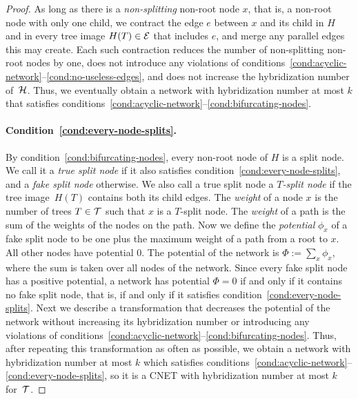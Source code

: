 \begin{proof}
  As long as there is a \emph{non-splitting} non-root node $x$, that is, a   non-root node with only one child, we contract the edge $e$ between $x$ and   its child in $H$ and in every tree image $H(T) \in \mathcal{E}$ that includes $e$, and   merge any parallel edges this may create. Each such contraction reduces the number of non-splitting non-root nodes by   one, does not introduce any violations of   conditions~\ref{cond:acyclic-network}--\ref{cond:no-useless-edges}, and does   not increase the hybridization number of~$\mathcal{H}$.   Thus, we eventually obtain a network with hybridization number at most $k$   that satisfies   conditions~\ref{cond:acyclic-network}--\ref{cond:bifurcating-nodes}.

  \paragraph{Condition~\ref{cond:every-node-splits}.}

  By condition~\ref{cond:bifurcating-nodes}, every non-root node of $H$ is a   split node.   We call it a \emph{true split node} if it also satisfies   condition~\ref{cond:every-node-splits}, and a \emph{fake split node}   otherwise.   We also call a true split node {a \emph{$T$-split node} if the tree image~$H(T)$ contains both its child edges.}   The \emph{weight} of a node $x$ is the number of trees $T \in \mathcal{T}$ such that   $x$ is a $T$-split node. The \emph{weight} of a path is the sum of the weights of the nodes on the path. Now we define the \emph{potential} $\phi_x$ of a fake split node to be one plus the maximum weight of a path from a root to $x$. {All} other nodes have potential $0$.   The potential of the network is $\Phi := \sum_x \phi_x$, where the sum is   taken over all nodes of the network.   Since every fake split node has a positive potential, a network has potential $\Phi = 0$ if and only if it contains no fake split node, that is, if and only if it satisfies condition~\ref{cond:every-node-splits}.   Next we describe a transformation that decreases the potential of the network   without increasing its hybridization number or introducing any violations   of conditions~\ref{cond:acyclic-network}--\ref{cond:bifurcating-nodes}.   Thus, {after repeating this transformation as often as possible, we} obtain a network with   hybridization number at most $k$ which satisfies  conditions~\ref{cond:acyclic-network}--\ref{cond:every-node-splits}, so it  is a CNET with hybridization number at most $k$   for~$\mathcal{T}$.


\end{proof}
